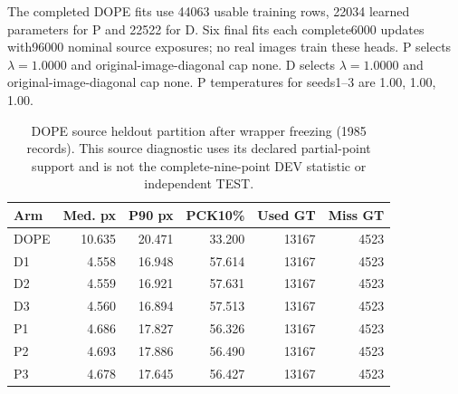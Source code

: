 The completed DOPE fits use 44063 usable training rows, 22034 learned parameters for P and 22522 for D. Six final fits each complete6000 updates with96000 nominal source exposures; no real images train these heads. P selects $\lambda=1.0000$ and original-image-diagonal cap none. D selects $\lambda=1.0000$ and original-image-diagonal cap none. P temperatures for seeds1--3 are 1.00, 1.00, 1.00.
\begin{table}[t]\centering\small
\caption{DOPE source heldout partition after wrapper freezing (1985 records). This source diagnostic uses its declared partial-point support and is not the complete-nine-point DEV statistic or independent TEST.}\label{tab:dopesource}
\begin{tabular}{lrrrrr}\toprule
Arm & Med. px & P90 px & PCK10\% & Used GT & Miss GT\\\midrule
DOPE & 10.635 & 20.471 & 33.200 & 13167 & 4523\\
D1 & 4.558 & 16.948 & 57.614 & 13167 & 4523\\
D2 & 4.559 & 16.921 & 57.631 & 13167 & 4523\\
D3 & 4.560 & 16.894 & 57.513 & 13167 & 4523\\
P1 & 4.686 & 17.827 & 56.326 & 13167 & 4523\\
P2 & 4.693 & 17.886 & 56.490 & 13167 & 4523\\
P3 & 4.678 & 17.645 & 56.427 & 13167 & 4523\\
\bottomrule\end{tabular}
\end{table}
